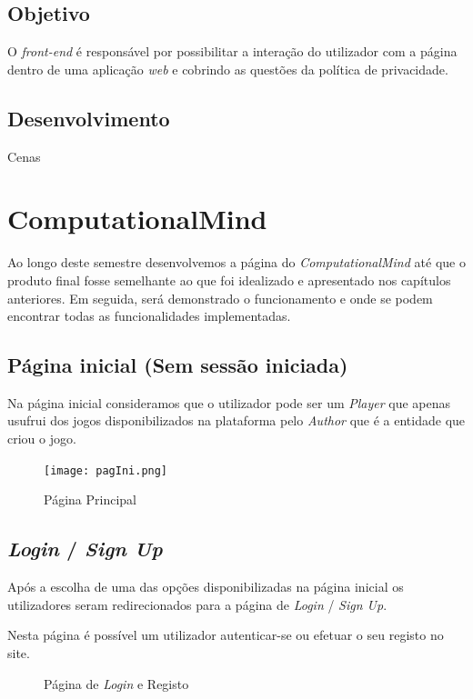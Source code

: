 \documentclass[11pt,a4paper]{report}
\begin{document}
\section{Objetivo}

O \emph{front-end} é responsável por possibilitar a interação do utilizador com a página dentro de uma aplicação \emph{web} e cobrindo as questões da política de privacidade.

\section{Desenvolvimento}

Cenas

\chapter{ComputationalMind}

Ao longo deste semestre desenvolvemos a página do \emph{ComputationalMind} até que o produto final fosse semelhante ao que foi idealizado e apresentado nos capítulos anteriores. Em seguida, será demonstrado o funcionamento e onde se podem encontrar todas as funcionalidades implementadas.

\section{Página inicial (Sem sessão iniciada)}

Na página inicial consideramos que o utilizador pode ser um \emph{Player} que apenas usufrui dos jogos disponibilizados na plataforma pelo \emph{Author} que é a entidade que criou o jogo.

\begin{figure}[h]
    \centering
    \texttt{[image: pagIni.png]}
    \caption{Página Principal}
    \label{fig:pagIni}
\end{figure}

\section{\emph{Login} / \emph{Sign Up}}
Após a escolha de uma das opções disponibilizadas na página inicial os utilizadores seram redirecionados para a página de \emph{Login} / \emph{Sign Up}. 

Nesta página é possível um utilizador autenticar-se ou efetuar o seu registo no site.

\begin{figure}[h]%
    \centering
    \qquad
    \caption{Página de \emph{Login} e Registo}%
    \label{fig:log&sigUp}%
\end{figure}
\end{document}

